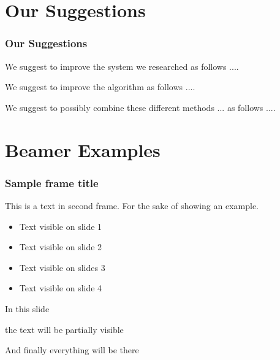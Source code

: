 \documentclass{beamer}
\begin{document}
\section{Our Suggestions}
\begin{frame}
\frametitle{Our Suggestions}
We suggest to improve the system we researched as follows ....

We suggest to improve the algorithm as follows ....

We suggest to possibly combine these different methods ... as follows ....

\end{frame}


\section{Beamer Examples}

\begin{frame}
\frametitle{Sample frame title}
This is a text in second frame. For the sake of showing an example.

\begin{itemize}
    \item<1-> Text visible on slide 1
    \item<2-> Text visible on slide 2
    \item<3> Text visible on slides 3
    \item<4-> Text visible on slide 4
\end{itemize}
\end{frame}

\begin{frame}
In this slide \pause

the text will be partially visible \pause

And finally everything will be there
\end{frame}
\end{document}
